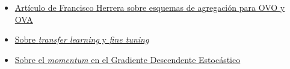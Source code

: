 \begin{itemize}
\item \href{http://sci2s.ugr.es/sites/default/files/files/ComplementaryMaterial/ovo_ova/AggregationMethodsDescription.pdf}{Artículo de Francisco Herrera sobre esquemas de agregación para OVO y OVA}
\item \href{https://deeplearningsandbox.com/how-to-use-transfer-learning-and-fine-tuning-in-keras-and-tensorflow-to-build-an-image-recognition-94b0b02444f2}{Sobre \textit{transfer learning} y \textit{fine tuning}}
\item \href{http://ufldl.stanford.edu/tutorial/supervised/OptimizationStochasticGradientDescent/}{Sobre el \textit{momentum} en el Gradiente Descendente Estocástico}
\end{itemize}